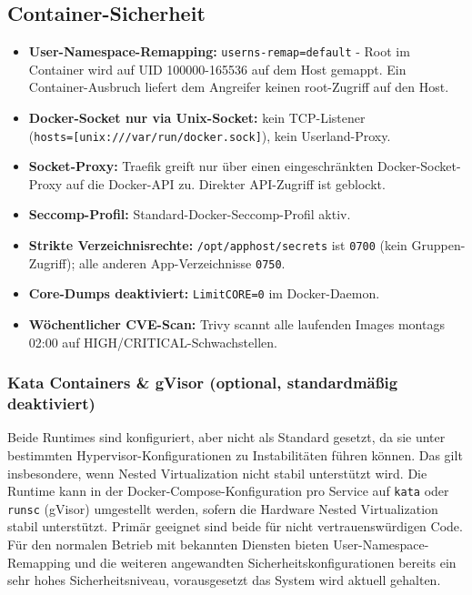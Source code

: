 \subsection{Container-Sicherheit}
\begin{itemize}
  \item \textbf{User-Namespace-Remapping:} \texttt{userns-remap=default} - Root im Container wird auf UID 100000-165536 auf dem Host gemappt. Ein Container-Ausbruch liefert dem Angreifer keinen root-Zugriff auf den Host.
  \item \textbf{Docker-Socket nur via Unix-Socket:} kein \ac{TCP}-Listener \\
  (\texttt{hosts=[\textquotedbl{}unix:///var/run/docker.sock\textquotedbl{}]}), kein Userland-Proxy.
  \item \textbf{Socket-Proxy:} Traefik greift nur über einen eingeschränkten Docker-Socket-Proxy auf die Docker-\acs{API} zu. Direkter \acs{API}-Zugriff ist geblockt.
  \item \textbf{Seccomp-Profil:} Standard-Docker-Seccomp-Profil aktiv.
  \item \textbf{Strikte Verzeichnisrechte:} \texttt{/opt/apphost/secrets} ist \texttt{0700} (kein Gruppen-Zugriff); alle anderen App-Verzeichnisse \texttt{0750}.
  \item \textbf{Core-Dumps deaktiviert:} \texttt{LimitCORE=0} im Docker-Daemon.
  \item \textbf{Wöchentlicher CVE-Scan:} Trivy scannt alle laufenden Images montags 02:00 auf HIGH/CRITICAL-Schwachstellen.
\end{itemize}

\subsubsection*{Kata Containers \& gVisor (optional, standardmäßig deaktiviert)} \label{sec:kata_konfig}
Beide Runtimes sind konfiguriert, aber nicht als Standard gesetzt, da sie
unter bestimmten Hypervisor-Konfigurationen zu Instabilitäten führen können.
Das gilt insbesondere, wenn Nested Virtualization nicht stabil unterstützt
wird. Die Runtime kann in der Docker-Compose-Konfiguration pro Service auf
\texttt{kata} oder \texttt{runsc} (gVisor) umgestellt werden, sofern die
Hardware Nested Virtualization stabil unterstützt. Primär geeignet sind beide
für nicht vertrauenswürdigen Code. Für den normalen Betrieb mit bekannten
Diensten bieten User-Namespace-Remapping und die weiteren angewandten
Sicherheitskonfigurationen bereits ein sehr hohes Sicherheitsniveau,
vorausgesetzt das System wird aktuell gehalten.


